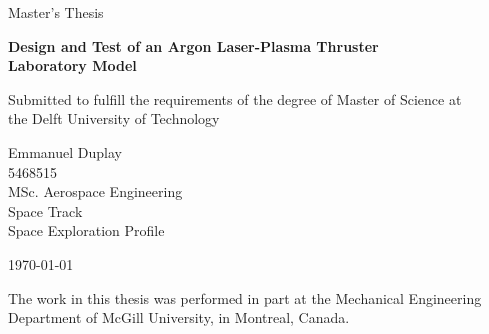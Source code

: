 \begin{titlepage}
    \thispagestyle{empty}
    \sffamily
    \vspace*{3cm}
    {\large 
        Master's Thesis
    }

    \vspace{0.3cm}
    \textbf{{\LARGE Design and Test of an Argon Laser-Plasma Thruster\\Laboratory Model}}

    \vspace{0.2cm}
    {\large 
        Submitted to fulfill the requirements of the degree of Master of Science at\\the Delft University of Technology

        \vspace{1cm}
        Emmanuel Duplay \\
        5468515 \\
        MSc. Aerospace Engineering \\
        Space Track \\
        Space Exploration Profile

        \vspace{0.5cm}
        \today
    }
    \vfill
    {   
        The work in this thesis was performed in part at the Mechanical Engineering Department of McGill University, in Montreal, Canada.
        
}
\end{titlepage}
